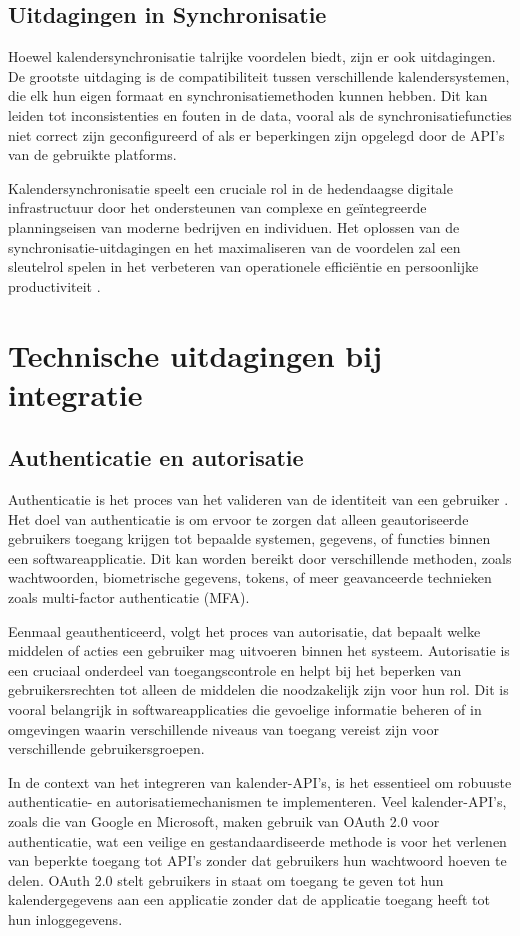\subsection{Uitdagingen in Synchronisatie}
Hoewel kalendersynchronisatie talrijke voordelen biedt, zijn er ook uitdagingen. De grootste uitdaging is de compatibiliteit tussen verschillende kalendersystemen, die elk hun eigen formaat en synchronisatiemethoden kunnen hebben. Dit kan leiden tot inconsistenties en fouten in de data, vooral als de synchronisatiefuncties niet correct zijn geconfigureerd of als er beperkingen zijn opgelegd door de API's van de gebruikte platforms.

Kalendersynchronisatie speelt een cruciale rol in de hedendaagse digitale infrastructuur door het ondersteunen van complexe en geïntegreerde planningseisen van moderne bedrijven en individuen. Het oplossen van de synchronisatie-uitdagingen en het maximaliseren van de voordelen zal een sleutelrol spelen in het verbeteren van operationele efficiëntie en persoonlijke productiviteit \autocite{Xhafa2016}.


\section{Technische uitdagingen bij integratie}
\subsection{Authenticatie en autorisatie}
Authenticatie is het proces van het valideren van de identiteit van een gebruiker \autocite{Lal2016}. Het doel van authenticatie is om ervoor te zorgen dat alleen geautoriseerde gebruikers toegang krijgen tot bepaalde systemen, gegevens, of functies binnen een softwareapplicatie. Dit kan worden bereikt door verschillende methoden, zoals wachtwoorden, biometrische gegevens, tokens, of meer geavanceerde technieken zoals multi-factor authenticatie (MFA).

Eenmaal geauthenticeerd, volgt het proces van autorisatie, dat bepaalt welke middelen of acties een gebruiker mag uitvoeren binnen het systeem. Autorisatie is een cruciaal onderdeel van toegangscontrole en helpt bij het beperken van gebruikersrechten tot alleen de middelen die noodzakelijk zijn voor hun rol. Dit is vooral belangrijk in softwareapplicaties die gevoelige informatie beheren of in omgevingen waarin verschillende niveaus van toegang vereist zijn voor verschillende gebruikersgroepen.

In de context van het integreren van kalender-API's, is het essentieel om robuuste authenticatie- en autorisatiemechanismen te implementeren. Veel kalender-API's, zoals die van Google en Microsoft, maken gebruik van OAuth 2.0 voor authenticatie, wat een veilige en gestandaardiseerde methode is voor het verlenen van beperkte toegang tot API's zonder dat gebruikers hun wachtwoord hoeven te delen. OAuth 2.0 stelt gebruikers in staat om toegang te geven tot hun kalendergegevens aan een applicatie zonder dat de applicatie toegang heeft tot hun inloggegevens.

